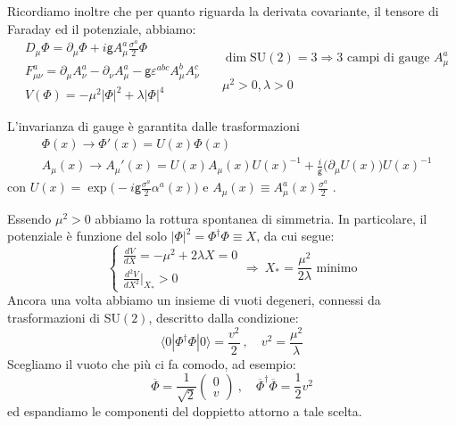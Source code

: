 \documentclass[../main.tex]{subfiles}
\begin{document}
Ricordiamo inoltre che per quanto riguarda la derivata covariante, il tensore di Faraday ed il potenziale, abbiamo:
\[
\boxed{\begin{aligned}
    &D_\mu\Phi = \partial_\mu\Phi +i\mathsf g A_\mu^a\frac{\sigma^a}{2}\Phi \\
    &F_{\mu\nu}^a = \partial_\mu A^a_\nu - \partial_\nu A^a_\mu - \mathsf g \varepsilon^{abc}A^b_\mu A^c_\nu \\
    &V(\Phi) = -\mu^2|\Phi|^2 + \lambda |\Phi|^4
\end{aligned}}
~\begin{aligned}
    &\dim \text{SU}(2) = 3 \Rightarrow 3 \text{ campi di gauge }A^a_\mu \\
    & \\
    & \mu^2 >0, \lambda>0
\end{aligned}
\]

L'invarianza di gauge è garantita dalle trasformazioni
\[
\boxed{\begin{aligned}
    &\Phi(x) \rightarrow \Phi'(x) = U(x)\Phi(x) \\
    &A_\mu(x)\rightarrow A_\mu'(x) =U(x)A_\mu(x)U(x)^{-1} +\frac{i}{\mathsf g}\big(\partial_\mu U(x)\big)U(x)^{-1}
\end{aligned}}
\]
con $U(x) = \exp\big(-i\mathsf g\frac{\sigma^a}{2}\alpha^a(x)\big)$ e $A_\mu(x) \equiv A^a_\mu(x)\frac{\sigma^a}{2}$ .

Essendo $\mu^2>0$ abbiamo la rottura spontanea di simmetria. In particolare, il potenziale è funzione del solo $|\Phi|^2=\Phi^\dagger\Phi \equiv X$, da cui segue:
\[
\begin{cases}
    \frac{dV}{dX} = -\mu^2 + 2\lambda X = 0 \\ 
    \frac{d^2V}{dX^2}\Big|_{X_\ast}>0
\end{cases}
\Rightarrow ~\boxed{X_\ast = \frac{\mu^2}{2\lambda} \text{ minimo}}
\]
Ancora una volta abbiamo un insieme di vuoti degeneri, connessi da trasformazioni di SU$(2)$, descritto dalla condizione:
\[
\langle0|\Phi^\dagger\Phi|0\rangle =\frac{v^2}{2}~,\quad v^2=\frac{\mu^2}{\lambda}
\]
Scegliamo il vuoto che più ci fa comodo, ad esempio:
\[
\boxed{\overline\Phi = \frac{1}{\sqrt{2}}\begin{pmatrix} 0 \\ v \end{pmatrix}~,\quad\overline\Phi^\dagger\overline\Phi = \frac{1}{2}v^2}
\]
ed espandiamo le componenti del doppietto attorno a tale scelta.
\end{document}

